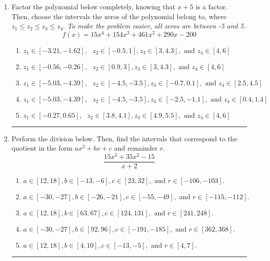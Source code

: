 \documentclass[14pt]{extbook}
\newcommand{\litem}[1]{\item#1\hspace*{-1cm}\rule{\textwidth}{0.4pt}}
\begin{document}
\begin{enumerate}
{\begin{enumerate}[label=\Alph*.]
\end{enumerate} }
\litem{
Factor the polynomial below completely, knowing that $x+5$ is a factor. Then, choose the intervals the zeros of the polynomial belong to, where $z_1 \leq z_2 \leq z_3 \leq z_4$. \textit{To make the problem easier, all zeros are between -5 and 5.}\[ f(x) = 15x^{4} +154 x^{3} +461 x^{2} +290 x -200 \]\begin{enumerate}[label=\Alph*.]
\item \( z_1 \in [-3.21, -1.62], \text{   }  z_2 \in [-0.5, 1], z_3 \in [3, 4.3], \text{   and   } z_4 \in [4, 6] \)
\item \( z_1 \in [-0.56, -0.26], \text{   }  z_2 \in [0.9, 3], z_3 \in [3, 4.3], \text{   and   } z_4 \in [4, 6] \)
\item \( z_1 \in [-5.03, -4.39], \text{   }  z_2 \in [-4.5, -3.5], z_3 \in [-0.7, 0.1], \text{   and   } z_4 \in [2.5, 4.5] \)
\item \( z_1 \in [-5.03, -4.39], \text{   }  z_2 \in [-4.5, -3.5], z_3 \in [-2.5, -1.1], \text{   and   } z_4 \in [0.4, 1.4] \)
\item \( z_1 \in [-0.27, 0.65], \text{   }  z_2 \in [3.8, 4.1], z_3 \in [4.9, 5.5], \text{   and   } z_4 \in [4, 6] \)

\end{enumerate} }
\litem{
Perform the division below. Then, find the intervals that correspond to the quotient in the form $ax^2+bx+c$ and remainder $r$.\[ \frac{15x^{3} +35 x^{2} -15}{x + 2} \]\begin{enumerate}[label=\Alph*.]
\item \( a \in [12, 18], b \in [-13, -6], c \in [23, 32], \text{ and } r \in [-106, -103]. \)
\item \( a \in [-30, -27], b \in [-26, -21], c \in [-55, -49], \text{ and } r \in [-115, -112]. \)
\item \( a \in [12, 18], b \in [63, 67], c \in [124, 131], \text{ and } r \in [241, 248]. \)
\item \( a \in [-30, -27], b \in [92, 96], c \in [-191, -185], \text{ and } r \in [362, 368]. \)
\item \( a \in [12, 18], b \in [4, 10], c \in [-13, -5], \text{ and } r \in [4, 7]. \)


\end{enumerate}}
\end{enumerate}
\end{document}
